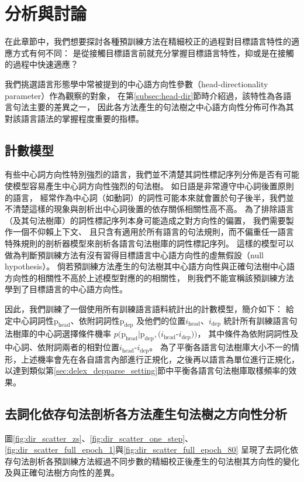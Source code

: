 \section{分析與討論}
在此章節中，我們想要探討各種預訓練方法在精細校正的過程對目標語言特性的適應方式有何不同：
是從接觸目標語言前就充分掌握目標語言特性，抑或是在接觸的過程中快速適應？

我們挑選語言形態學中常被提到的中心語方向性參數（head-directionality parameter）作為觀察的對象，
在第\ref{subsec:head-dir}節時介紹過，該特性為各語言句法主要的差異之一，
因此各方法產生的句法樹之中心語方向性分佈可作為其對該語言語法的掌握程度重要的指標。
\subsection{計數模型}
有些中心詞方向性特別強烈的語言，我們並不清楚其詞性標記序列分佈是否有可能使模型容易產生中心詞方向性強烈的句法樹。
如日語是非常遵守中心詞後置原則的語言，
經常作為中心詞（如動詞）的詞性可能本來就會置於句子後半，我們並不清楚這樣的現象與剖析出中心詞後置的依存關係相關性高不高。
為了排除語言（及其句法樹庫）的詞性標記序列本身可能造成之對方向性的偏置，
我們需要製作一個不仰賴上下文、
且只含有適用於所有語言的句法規則，而不偏重任一語言特殊規則的剖析器模型來剖析各語言句法樹庫的詞性標記序列。
這樣的模型可以做為判斷預訓練方法有沒有習得目標語言中心語方向性的虛無假設（null hypothesis）。
倘若預訓練方法產生的句法樹其中心語方向性與正確句法樹中心語方向性的相關性不高於上述模型對應的的相關性，
則我們不能宣稱該預訓練方法學到了目標語言的中心語方向性。

因此，我們訓練了一個使用所有訓練語言語料統計出的計數模型，簡介如下：
給定中心詞詞性$\textrm{p}_{\textrm{head}}$、依附詞詞性$\textrm{p}_{\textrm{dep}}$
及他們的位置$i_{\textrm{head}}$、$i_{\textrm{dep}}$
統計所有訓練語言句法樹庫的中心詞選擇條件機率
$p (\textrm{p}_{\textrm{head}}|\textrm{p}_{\textrm{dep}}, (i_{\textrm{head}}$-$i_{\textrm{dep}}))$，
其中條件為依附詞詞性及中心詞、依附詞兩者的相對位置$i_{\textrm{head}}$-$i_{\textrm{dep}}$。
為了平衡各語言句法樹庫大小不一的情形，上述機率會先在各自語言內部進行正規化，之後再以語言為單位進行正規化，
以達到類似第\ref{sec:delex_depparse_setting}節中平衡各語言句法樹庫取樣頻率的效果。
\subsection{去詞化依存句法剖析各方法產生句法樹之方向性分析}
圖\ref{fig:dir_scatter_zs}、\ref{fig:dir_scatter_one_step}、\ref{fig:dir_scatter_full_epoch_1}與\ref{fig:dir_scatter_full_epoch_80}
呈現了去詞化依存句法剖析各預訓練方法經過不同步數的精細校正後產生的句法樹其方向性的變化及與正確句法樹方向性的差異。

